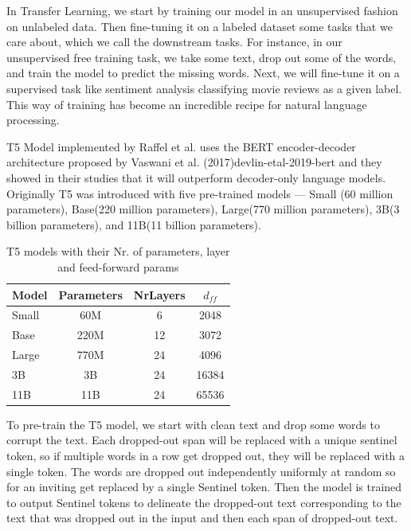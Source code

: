 
In Transfer Learning, we start by training our model in an unsupervised fashion on unlabeled data. Then fine-tuning it on a labeled dataset some tasks that we care about, which we call the downstream tasks. For instance, in our unsupervised free training task, we take some text, drop out some of the words, and train the model to predict the missing words. Next, we will fine-tune it on a supervised task like sentiment analysis classifying movie reviews as a given label. This way of training has become an incredible recipe for natural language processing.

\ac{T5} Model implemented by Raffel et al. \cite{raffel_exploring_2020} uses the BERT encoder-decoder architecture proposed by Vaswani et al. (2017){devlin-etal-2019-bert} and they showed in their studies that it will outperform decoder-only language models. Originally T5 was introduced with five pre-trained models — Small (60 million parameters), Base(220 million parameters), Large(770 million parameters), 3B(3 billion parameters), and 11B(11 billion parameters)\cite{raffel_exploring_2020}.

\begin{table}[H]
    \centering
    \begin{tabular}{lccc}
        \hline
        Model & Parameters & NrLayers & $d_{ff}$ \\
        \hline
        Small & 60M        & 6        & 2048     \\
        Base  & 220M       & 12       & 3072     \\
        Large & 770M       & 24       & 4096     \\
        3B    & 3B         & 24       & 16384    \\
        11B   & 11B        & 24       & 65536    \\
        \hline
    \end{tabular}
    \caption{T5 models with their Nr. of parameters, layer and feed-forward params}
\end{table}


To pre-train the T5 model, we start with clean text and drop some words to corrupt the text. Each dropped-out span will be replaced with a unique sentinel token, so if multiple words in a row get dropped out, they will be replaced with a single token. The words are dropped out independently uniformly at random so for an inviting get replaced by a single Sentinel token. Then the model is trained to output Sentinel tokens to delineate the dropped-out text corresponding to the text that was dropped out in the input and then each span of dropped-out text.

